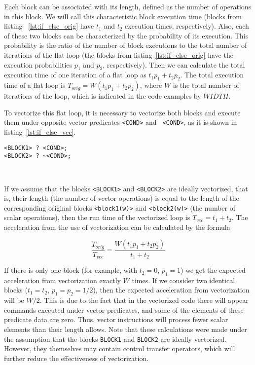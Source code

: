 \documentclass[
11pt,%
tightenlines,%
twoside,%
onecolumn,%
nofloats,%
nobibnotes,%
nofootinbib,%
superscriptaddress,%
noshowpacs,%
centertags]%
{revtex4}
\begin{document}
Each block can be associated with its length, defined as the number of operations in this block.
We will call this characteristic block execution time (blocks from listing ~\ref{lst:if_else_orig} have $t_1$ and $t_2$ execution times, respectively).
Also, each of these two blocks can be characterized by the probability of its execution.
This probability is the ratio of the number of block executions to the total number of iterations of the flat loop (the blocks from listing~\ref{lst:if_else_orig} have the execution probabilities $p_1$ and $p_2$, respectively).
Then we can calculate the total execution time of one iteration of a flat loop as $t_1 p_1 + t_2 p_2$.
The total execution time of a flat loop is $T_ {orig} = W (t_1 p_1 + t_2 p_2)$, where $W$ is the total number of iterations of the loop, which is indicated in the code examples by $WIDTH$.

To vectorize this flat loop, it is necessary to vectorize both blocks and execute them under opposite vector predicates \texttt{<COND>} and \texttt{~<COND>}, as it is shown in listing~\ref{lst:if_else_vec}.

\begin{lstlisting}[caption={Vectorized construction \texttt{if-else}.},label={lst:if_else_vec}]
<BLOCK1> ? <COND>;
<BLOCK2> ? ~<COND>;
\end{lstlisting}

\

If we assume that the blocks \texttt{<BLOCK1>} and \texttt{<BLOCK2>} are ideally vectorized, that is, their length (the number of vector operations) is equal to the length of the corresponding original blocks \texttt{<block1(w)>} and \texttt{<block2(w)>} (the number of scalar operations), then the run time of the vectorized loop is $T_{vec} = t_1 + t_2$.
The acceleration from the use of vectorization can be calculated by the formula

\begin{equation}
\frac{T_{orig}}{T_{vec}} = \frac{W(t_1 p_1 + t_2 p_2)}{t_1 + t_2}
\end{equation}

If there is only one block (for example, with $t_2 = 0$, $p_1 = 1$) we get the expected acceleration from vectorization exactly $W$ times.
If we consider two identical blocks ($t_1 = t_2$, $p_1 = p_2 = 1/2$), then the expected acceleration from vectorization will be $W / 2$.
This is due to the fact that in the vectorized code there will appear commands executed under vector predicates, and some of the elements of these predicate data are zero.
Thus, vector instructions will process fewer scalar elements than their length allows.
Note that these calculations were made under the assumption that the blocks \texttt{BLOCK1} and \texttt{BLOCK2} are ideally vectorized.
However, they themselves may contain control transfer operators, which will further reduce the effectiveness of vectorization.
\end{document}
